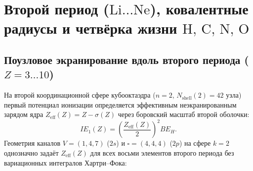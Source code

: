 \chapter{Второй период (\texorpdfstring{$\text{Li}\ldots\text{Ne}$}{Li..Ne}), ковалентные радиусы и четвёрка жизни \texorpdfstring{$\text{H, C, N, O}$}{H, C, N, O}}
\label{ch:chem-second-period}

\section{Поузловое экранирование вдоль второго периода (\texorpdfstring{$Z=3\ldots 10$}{Z=3..10})}
\label{sec:chem-second-period-screening}

На второй координационной сфере кубооктаэдра ($n=2$, $N_{\mathrm{shell}}(2)=42$ узла) первый потенциал ионизации
определяется эффективным неэкранированным зарядом ядра $Z_{\mathrm{eff}}(Z)=Z-\sigma(Z)$ через боровский масштаб второй оболочки:
\[
  IE_1(Z) = \left(\frac{Z_{\mathrm{eff}}(Z)}{2}\right)^{\!2} BE_H.
\]
Геометрия каналов $V=(1,4,7)$ ($2s$) и $\square=(4,4,4)$ ($2p$) на сфере $k=2$ однозначно задаёт $Z_{\mathrm{eff}}(Z)$ для всех восьми элементов второго периода без вариационных интегралов Хартри--Фока:
